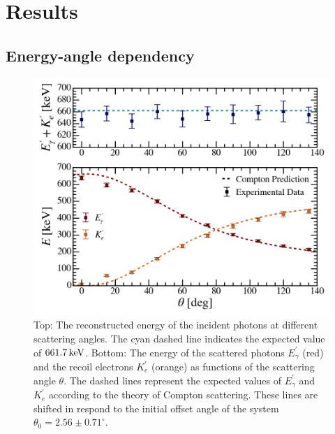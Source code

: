 \documentclass[aps,twocolumn,secnumarabic,balancelastpage,amsmath,amssymb,nofootinbib,floatfix]{revtex4-1}
\newcommand{\keV}{\,{\rm keV}}
\begin{document}
\section{Results}
\label{sec:result}

\subsection{Energy-angle dependency}
\label{ssec:energy_angle_dependency}

\begin{figure}
    \centering
    \includegraphics[width=0.49 \textwidth]{Figures/energy_angle_dependency.png}
    \caption{Top: The reconstructed energy of the incident photons at different scattering angles. The cyan dashed line indicates the expected value of $661.7\keV$. Bottom: The energy of the scattered photons $E_\gamma^{\prime}$ (red) and the recoil electrons $K_e^{\prime}$ (orange) as functions of the scattering angle $\theta$. The dashed lines represent the expected values of $E_\gamma^{\prime}$ and $K_e^{\prime}$ according to the theory of Compton scattering. These lines are shifted in respond to the initial offset angle of the system $\theta_0 = 2.56 \pm 0.71^\circ$.}
    \label{fig:energy_angle_dependency}
\end{figure}
\end{document}
